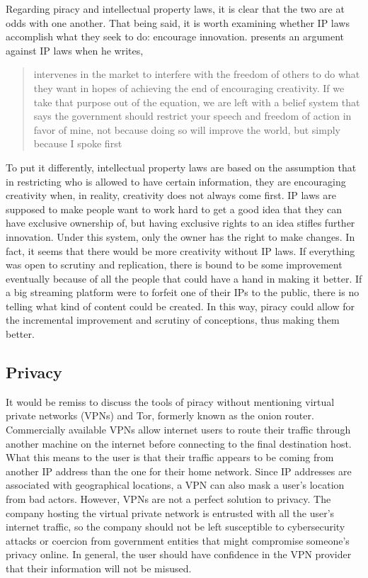 \documentclass[onecolumn, 12pt]{article}
\begin{document}
\begin{refsection}
Regarding piracy and intellectual property laws, it is clear that the two are at odds with
one another. That being said, it is worth examining whether IP laws accomplish what they
seek to do: encourage innovation. \citeauthor{lemley:faith-based} presents an argument
against IP laws when he writes, \blockcquote[1339]{lemley:faith-based}[.]{%
   intervenes in the market to interfere with the freedom of others
  to do what they want in hopes of achieving the end of encouraging creativity.
  If we take that purpose out of the equation, we are left with a belief system
  that says the government should restrict your speech and freedom of action in
  favor of mine, not because doing so will improve the world, but simply because
  I spoke first%
}
To put it differently, intellectual property laws are based on the assumption that in
restricting who is allowed to have certain information, they are encouraging creativity
when, in reality, creativity does not always come first. IP laws are supposed to make
people want to work hard to get a good idea that they can have exclusive ownership of, but
having exclusive rights to an idea stifles further innovation. Under this system, only the
owner has the right to make changes. In fact, it seems that there would be more creativity
without IP laws. If everything was open to scrutiny and replication, there is bound to be
some improvement eventually because of all the people that could have a hand in making it
better. If a big streaming platform were to forfeit one of their IPs to the public, there
is no telling what kind of content could be created. In this way, piracy could allow for
the incremental improvement and scrutiny of conceptions, thus making them better.

\subsection{Privacy}
It would be remiss to discuss the tools of piracy without mentioning virtual private
networks (VPNs) and Tor, formerly known as the onion router. Commercially available VPNs
allow internet users to route their traffic through another machine on the internet before
connecting to the final destination host. What this means to the user is that their
traffic appears to be coming from another IP address than the one for their home network.
Since IP addresses are associated with geographical locations, a VPN can also mask a
user's location from bad actors. However, VPNs are not a perfect solution to privacy. The
company hosting the virtual private network is entrusted with all the user's internet
traffic, so the company should not be left susceptible to cybersecurity attacks or
coercion from government entities that might compromise someone's privacy online. In
general, the user should have confidence in the VPN provider that their information will
not be misused.


\end{refsection}
\end{document}
